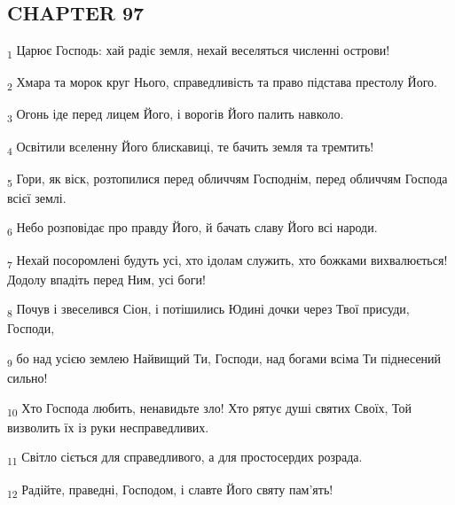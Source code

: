 \subsection{CHAPTER 97}
\begin{tcolorbox}
\textsubscript{1} Царює Господь: хай радіє земля, нехай веселяться численні острови!
\end{tcolorbox}
\begin{tcolorbox}
\textsubscript{2} Хмара та морок круг Нього, справедливість та право підстава престолу Його.
\end{tcolorbox}
\begin{tcolorbox}
\textsubscript{3} Огонь іде перед лицем Його, і ворогів Його палить навколо.
\end{tcolorbox}
\begin{tcolorbox}
\textsubscript{4} Освітили вселенну Його блискавиці, те бачить земля та тремтить!
\end{tcolorbox}
\begin{tcolorbox}
\textsubscript{5} Гори, як віск, розтопилися перед обличчям Господнім, перед обличчям Господа всієї землі.
\end{tcolorbox}
\begin{tcolorbox}
\textsubscript{6} Небо розповідає про правду Його, й бачать славу Його всі народи.
\end{tcolorbox}
\begin{tcolorbox}
\textsubscript{7} Нехай посоромлені будуть усі, хто ідолам служить, хто божками вихвалюється! Додолу впадіть перед Ним, усі боги!
\end{tcolorbox}
\begin{tcolorbox}
\textsubscript{8} Почув і звеселився Сіон, і потішились Юдині дочки через Твої присуди, Господи,
\end{tcolorbox}
\begin{tcolorbox}
\textsubscript{9} бо над усією землею Найвищий Ти, Господи, над богами всіма Ти піднесений сильно!
\end{tcolorbox}
\begin{tcolorbox}
\textsubscript{10} Хто Господа любить, ненавидьте зло! Хто рятує душі святих Своїх, Той визволить їх із руки несправедливих.
\end{tcolorbox}
\begin{tcolorbox}
\textsubscript{11} Світло сіється для справедливого, а для простосердих розрада.
\end{tcolorbox}
\begin{tcolorbox}
\textsubscript{12} Радійте, праведні, Господом, і славте Його святу пам'ять!
\end{tcolorbox}
